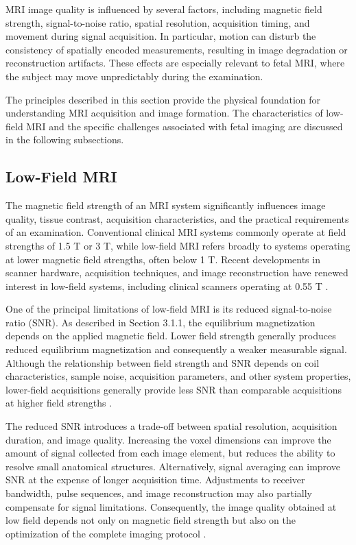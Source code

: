 MRI image quality is influenced by several factors, including magnetic field strength, signal-to-noise ratio, spatial resolution, acquisition timing, and movement during signal acquisition. In particular, motion can disturb the consistency of spatially encoded measurements, resulting in image degradation or reconstruction artifacts. These effects are especially relevant to fetal MRI, where the subject may move unpredictably during the examination.

The principles described in this section provide the physical foundation for understanding MRI acquisition and image formation. The characteristics of low-field MRI and the specific challenges associated with fetal imaging are discussed in the following subsections.

\subsection{Low-Field MRI}

The magnetic field strength of an MRI system significantly influences image quality, tissue contrast, acquisition characteristics, and the practical requirements of an examination. Conventional clinical MRI systems commonly operate at field strengths of 1.5 T or 3 T, while low-field MRI refers broadly to systems operating at lower magnetic field strengths, often below 1 T. Recent developments in scanner hardware, acquisition techniques, and image reconstruction have renewed interest in low-field systems, including clinical scanners operating at 0.55 T \autocite{lowfieldbody2023,avilesverdera2023lowfield}.

One of the principal limitations of low-field MRI is its reduced signal-to-noise ratio (SNR). As described in Section 3.1.1, the equilibrium magnetization depends on the applied magnetic field. Lower field strength generally produces reduced equilibrium magnetization and consequently a weaker measurable signal. Although the relationship between field strength and SNR depends on coil characteristics, sample noise, acquisition parameters, and other system properties, lower-field acquisitions generally provide less SNR than comparable acquisitions at higher field strengths \autocite{lowfieldbody2023}.

The reduced SNR introduces a trade-off between spatial resolution, acquisition duration, and image quality. Increasing the voxel dimensions can improve the amount of signal collected from each image element, but reduces the ability to resolve small anatomical structures. Alternatively, signal averaging can improve SNR at the expense of longer acquisition time. Adjustments to receiver bandwidth, pulse sequences, and image reconstruction may also partially compensate for signal limitations. Consequently, the image quality obtained at low field depends not only on magnetic field strength but also on the optimization of the complete imaging protocol \autocite{lowfieldbody2023}.

